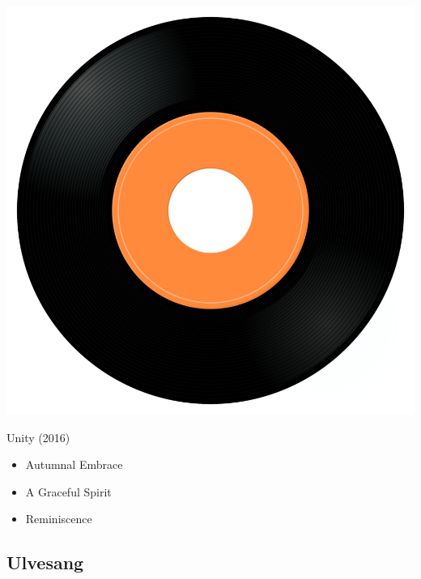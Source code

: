 \begin{minipage}[t]{0.25\textwidth}
\captionsetup{type=figure}
\includegraphics[width=\textwidth]{Images/cover.png}
\caption*{Unity (2016)}
\end{minipage}
\begin{minipage}[t]{0.25\textwidth}\vspace{0pt}
\begin{itemize}[nosep,leftmargin=1em,labelwidth=*,align=left]
	\setlength{\itemsep}{0pt}
	\item Autumnal Embrace
	\item A Graceful Spirit
	\item Reminiscence
\end{itemize}
\end{minipage}

\subsection{Ulvesang}

